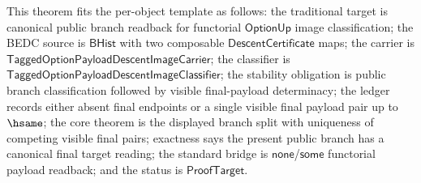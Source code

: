 \begin{theorem}
\label{thm:tagged-option-composite-image-classifier-canonical-public-branch-readback}
This theorem fits the per-object template as follows: the traditional target is
canonical public branch readback for functorial $\mathsf{OptionUp}$ image
classification; the BEDC source is $\mathsf{BHist}$ with two composable
$\mathsf{DescentCertificate}$ maps; the carrier is
$\mathsf{TaggedOptionPayloadDescentImageCarrier}$; the classifier is
$\mathsf{TaggedOptionPayloadDescentImageClassifier}$; the stability obligation
is public branch classification followed by visible final-payload determinacy;
the ledger records either absent final endpoints or a single visible final
payload pair up to $\hsame$; the core theorem is the displayed branch split
with uniqueness of competing visible final pairs; exactness says the present
public branch has a canonical final target reading; the standard bridge is
$\mathsf{none}$/$\mathsf{some}$ functorial payload readback; and the status is
$\mathsf{ProofTarget}$.


\end{theorem}
